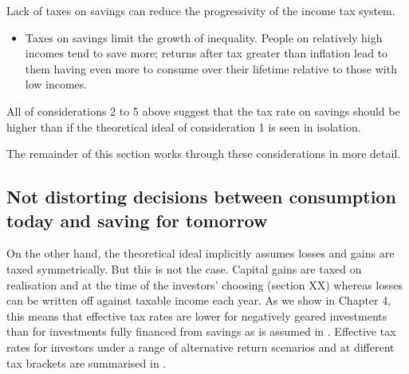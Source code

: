 \documentclass{grattan}\usepackage[]{graphicx}\usepackage[]{color}
\begin{document}
\consideration Lack of taxes on savings can reduce the progressivity of the income tax system.
\begin{itemize}
\item 	Taxes on savings limit the growth of inequality. People on relatively high incomes tend to save more; returns after tax greater than
inflation lead to them having even more to consume over their lifetime relative to those with low incomes.
\end{itemize}
All of considerations 2 to 5 above suggest that the tax rate on savings should be higher than if the theoretical ideal of consideration 1 is seen in isolation.

The remainder of this section works through these considerations in more detail.

\subsection{Not distorting decisions between consumption today and saving for tomorrow}
On the other hand, the theoretical ideal implicitly assumes losses and gains are taxed symmetrically. But this is not the case. Capital gains are taxed on realisation and at the time of the investors' choosing (section XX) whereas losses can be written off against taxable income each year. As we show in Chapter 4, this means that effective tax rates are lower for negatively geared investments than for investments fully financed from savings as is assumed in . Effective tax rates for investors under a range of alternative return scenarios and at different tax brackets are summarised in .
\end{document}
